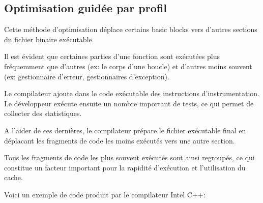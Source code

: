 ﻿


\subsection{Optimisation guidée par profil}
\label{PGO}

\myindex{\oracle}

Cette méthode d'optimisation déplace certains \gls{basic block}s vers d'autres sections du fichier 
binaire exécutable.

Il est évident que certaines parties d'une fonction sont exécutées plus fréquemment que d'autres
(ex: le corps d'une boucle) et d'autres moins souvent (ex: gestionnaire d'erreur, gestionnaires 
d'exception).

Le compilateur ajoute dans le code exécutable des instructions d'instrumentation. Le développeur 
exécute ensuite un nombre important de tests, ce qui permet de collecter des statistiques.

A l'aider de ces dernières, le compilateur prépare le fichier exécutable final en déplacant les 
fragments de code les moins exécutés vers une autre section.

Tous les fragments de code les plus souvent exécutés sont ainsi regroupés, ce qui constitue un 
facteur important pour la rapidité d'exécution et l'utilisation du cache.

Voici un exemple de code \oracle produit par le compilateur Intel C++:


